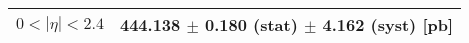\begin{tabular}{lc}
\hline
$0 < |\eta| <2.4$              & 444.138 $\pm$ 0.180 (stat) $\pm$ 4.162 (syst) [pb]  \\
\hline
\end{tabular}
